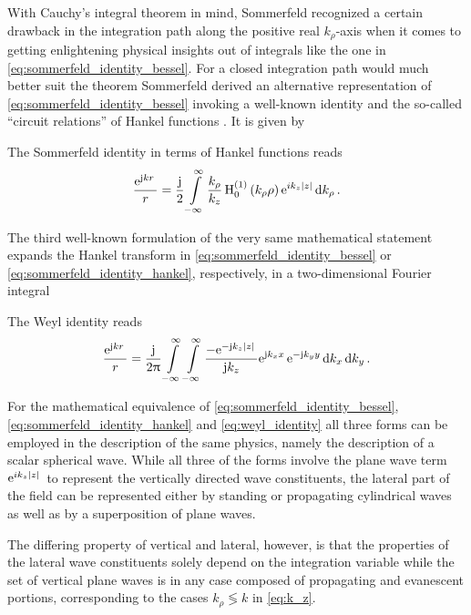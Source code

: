 With Cauchy's integral theorem in mind, Sommerfeld recognized a certain drawback in the integration path along the positive real $k_\rho$-axis when it comes to getting enlightening physical insights out of integrals like the one in \eqref{eq:sommerfeld_identity_bessel}. For a closed integration path would much better suit the theorem Sommerfeld derived an alternative representation of \eqref{eq:sommerfeld_identity_bessel} invoking a well-known identity \cite[eq.~10.4.4]{Olver2010} and the so-called \enquote{circuit relations} of Hankel functions \cite[p.~314]{Sommerfeld1964}. It is given by
\begin{corollary}
	The Sommerfeld identity in terms of Hankel functions reads
	\begin{equation}\label{eq:sommerfeld_identity_hankel}
		\frac{\exp{\im k r}}{r} = \frac{\im}{2} \int\limits_{-\infty}^{\infty} \frac{k_\rho}{k_z} \besselh{1}{0} \left(k_\rho \rho\right) \exp{i k_z \abs{z}} \dd k_\rho \, .
	\end{equation}
\end{corollary}
The third well-known formulation of the very same mathematical statement expands the Hankel transform in \eqref{eq:sommerfeld_identity_bessel} or \eqref{eq:sommerfeld_identity_hankel}, respectively, in a two-dimensional Fourier integral
\begin{corollary}\label{coll:wely_identity}
	The Weyl identity reads
	\begin{equation}\label{eq:weyl_identity}
		\frac{\exp{\im k r}}{r} = \frac{\im}{2\pi} \int\limits_{-\infty}^{\infty} \int\limits_{-\infty}^{\infty} \frac{-\exp{-\im k_z \abs{z}}}{\im k_z} \exp{\im k_x x} \exp{-\im k_y y} \dd k_x \, \dd k_y \, .
	\end{equation}
\end{corollary}

For the mathematical equivalence of \eqref{eq:sommerfeld_identity_bessel}, \eqref{eq:sommerfeld_identity_hankel} and \eqref{eq:weyl_identity} all three forms can be employed in the description of the same physics, namely the description of a scalar spherical wave. While all three of the forms involve the plane wave term $\exp{i k_z \abs{z}}$ to represent the vertically directed wave constituents, the lateral part of the field can be represented either by standing or propagating cylindrical waves as well as by a superposition of plane waves.

The differing property of vertical and lateral, however, is that the properties of the lateral wave constituents solely depend on the integration variable while the set of vertical plane waves is in any case composed of propagating and evanescent portions, corresponding to the cases $k_\rho \lessgtr k$ in \eqref{eq:k_z}.

